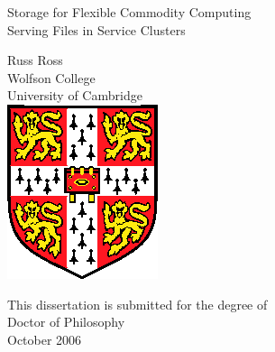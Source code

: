 \pagestyle{empty}

\begin{center}
\vspace*{\fill}

%

\Huge
Storage for Flexible Commodity Computing\\
Serving Files in Service Clusters

\vfill
\vfill

\LARGE 
Russ Ross\\[6mm]
Wolfson College\\
University of Cambridge\\

\vfill
\includegraphics{eps/camshield}
\vfill

\Large
This dissertation is submitted for the degree of\\
Doctor of Philosophy\\[4mm]

October 2006

\vspace*{\fill}
\end{center}
\cleardoublepage

\pagestyle{plain}

%

\enlargethispage*{60cm}        %

{}
\cleardoublepage

%

%        
%

%

